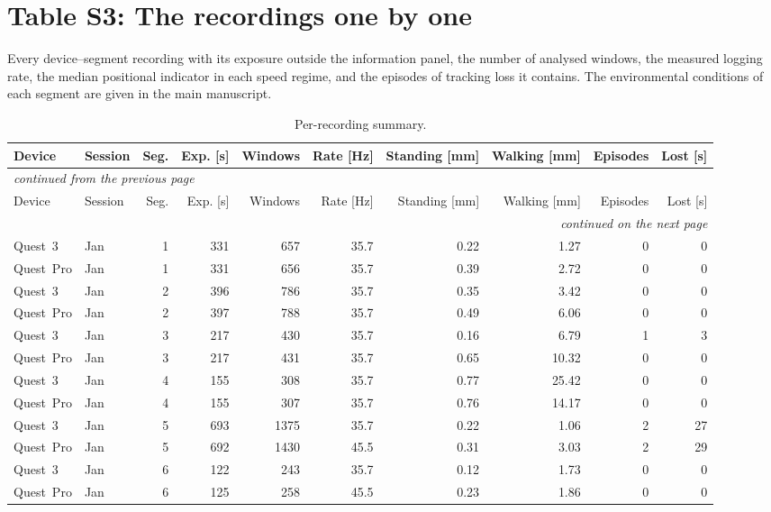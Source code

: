 \documentclass[11pt,a4paper]{article}
\begin{document}
\section*{Table S3: The recordings one by one}

Every device--segment recording with its exposure outside the information panel, the number of analysed windows, the measured logging rate, the median positional indicator in each speed regime, and the episodes of tracking loss it contains. The environmental conditions of each segment are given in the main manuscript.

{\footnotesize\setlength{\tabcolsep}{4pt}
\begin{longtable}{llrrrrrrrr}
\caption{Per-recording summary.}\label{tab:S3}\\
\toprule
Device & Session & Seg. & Exp. [s] & Windows & Rate [Hz] & Standing [mm] & Walking [mm] & Episodes & Lost [s] \\
\midrule
\endfirsthead
\multicolumn{10}{l}{\footnotesize\itshape continued from the previous page}\\
\toprule
Device & Session & Seg. & Exp. [s] & Windows & Rate [Hz] & Standing [mm] & Walking [mm] & Episodes & Lost [s] \\
\midrule
\endhead
\midrule
\multicolumn{10}{r}{\footnotesize\itshape continued on the next page}\\
\endfoot
\bottomrule
\endlastfoot
Quest~3 & Jan & 1 & 331 & 657 & 35.7 & 0.22 & 1.27 & 0 & 0 \\
Quest~Pro & Jan & 1 & 331 & 656 & 35.7 & 0.39 & 2.72 & 0 & 0 \\
Quest~3 & Jan & 2 & 396 & 786 & 35.7 & 0.35 & 3.42 & 0 & 0 \\
Quest~Pro & Jan & 2 & 397 & 788 & 35.7 & 0.49 & 6.06 & 0 & 0 \\
Quest~3 & Jan & 3 & 217 & 430 & 35.7 & 0.16 & 6.79 & 1 & 3 \\
Quest~Pro & Jan & 3 & 217 & 431 & 35.7 & 0.65 & 10.32 & 0 & 0 \\
Quest~3 & Jan & 4 & 155 & 308 & 35.7 & 0.77 & 25.42 & 0 & 0 \\
Quest~Pro & Jan & 4 & 155 & 307 & 35.7 & 0.76 & 14.17 & 0 & 0 \\
Quest~3 & Jan & 5 & 693 & 1375 & 35.7 & 0.22 & 1.06 & 2 & 27 \\
Quest~Pro & Jan & 5 & 692 & 1430 & 45.5 & 0.31 & 3.03 & 2 & 29 \\
Quest~3 & Jan & 6 & 122 & 243 & 35.7 & 0.12 & 1.73 & 0 & 0 \\
Quest~Pro & Jan & 6 & 125 & 258 & 45.5 & 0.23 & 1.86 & 0 & 0 \\

\end{longtable}}
\end{document}

